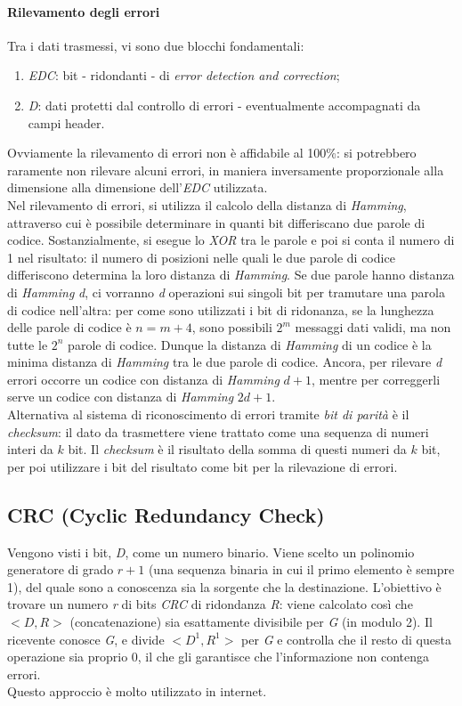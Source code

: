 \paragraph{Rilevamento degli errori}
Tra i dati trasmessi, vi sono due blocchi fondamentali:
\begin{enumerate}
	\item \textit{EDC}: bit - ridondanti - di \textit{error detection and correction};
	\item \textit{D}: dati protetti dal controllo di errori - eventualmente accompagnati da campi header.
\end{enumerate}
Ovviamente la rilevamento di errori non è affidabile al 100\%: si potrebbero raramente non rilevare alcuni errori, in maniera inversamente proporzionale alla dimensione alla dimensione dell'\textit{EDC} utilizzata. \\
Nel rilevamento di errori, si utilizza il calcolo della distanza di \textit{Hamming}, attraverso cui è possibile determinare in quanti bit differiscano due parole di codice. Sostanzialmente, si esegue lo \textit{XOR} tra le parole e poi si conta il numero di 1 nel risultato: il numero di posizioni nelle quali le due parole di codice differiscono determina la loro distanza di \textit{Hamming}. Se due parole hanno distanza di \textit{Hamming} \textit{d}, ci vorranno \textit{d} operazioni sui singoli bit per tramutare una parola di codice nell'altra: per come sono utilizzati i bit di ridonanza, se la lunghezza delle parole di codice è $n=m+4$, sono possibili $2^m$ messaggi dati validi, ma non tutte le $2^n$ parole di codice. Dunque la distanza di \textit{Hamming} di un codice è la minima distanza di \textit{Hamming} tra le due parole di codice. Ancora, per rilevare \textit{d} errori occorre un codice con distanza di \textit{Hamming} $d+1$, mentre per correggerli serve un codice con distanza di \textit{Hamming} $2d+1$. \\
Alternativa al sistema di riconoscimento di errori tramite \textit{bit di parità} è il \textit{checksum}: il dato da trasmettere viene trattato come una sequenza di numeri interi da $k$ bit. Il \textit{checksum} è il risultato della somma di questi numeri da $k$ bit, per poi utilizzare i bit del risultato come bit per la rilevazione di errori.

\subsection{CRC (Cyclic Redundancy Check)}
Vengono visti i bit, \textit{D}, come un numero binario. Viene scelto un polinomio generatore di grado $r+1$ (una sequenza binaria in cui il primo elemento è sempre 1), del quale sono a conoscenza sia la sorgente che la destinazione. L'obiettivo è trovare un numero \textit{r} di bits \textit{CRC} di ridondanza \textit{R}: viene calcolato così che $<D,R>$ (concatenazione) sia esattamente divisibile per \textit{G} (in modulo 2). Il ricevente conosce \textit{G}, e divide $<D^1,R^1>$ per \textit{G} e controlla che il resto di questa operazione sia proprio 0, il che gli garantisce che l'informazione non contenga errori. \\
Questo approccio è molto utilizzato in internet.

